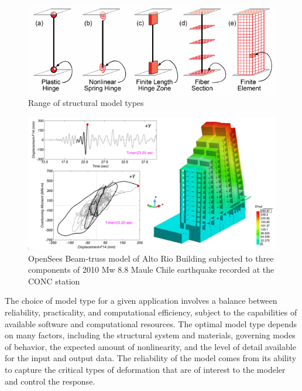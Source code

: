 \begin{figure}[htb]
    \centering
    \includegraphics[width=1.0\textwidth, angle = 0]{Figures/ModelTypes.pdf}
    \caption{Range of structural model types \citep{deierlein2010nonlinear}}
    \label{fig:response_ModelTypes}
\end{figure}

\begin{figure}[htb]
    \centering
    \includegraphics[width=1.0\textwidth, angle = 0]{Figures/Alto_Rio_bldg.png}
    \caption{OpenSees Beam-truss model of Alto Rio Building subjected to three components of 2010 Mw 8.8 Maule Chile earthquake recorded at the CONC station \citep{zhang2017nonlinear}}
    \label{fig:response_AltoRio}
\end{figure}

The choice of model type for a given application involves a balance between reliability, practicality, and computational efficiency, subject to the capabilities of available software and computational resources. The optimal model type depends on many factors, including the structural system and materials, governing modes of behavior, the expected amount of nonlinearity, and the level of detail available for the input and output data. The reliability of the model comes from its ability to capture the critical types of deformation that are of interest to the modeler and control the response. 


